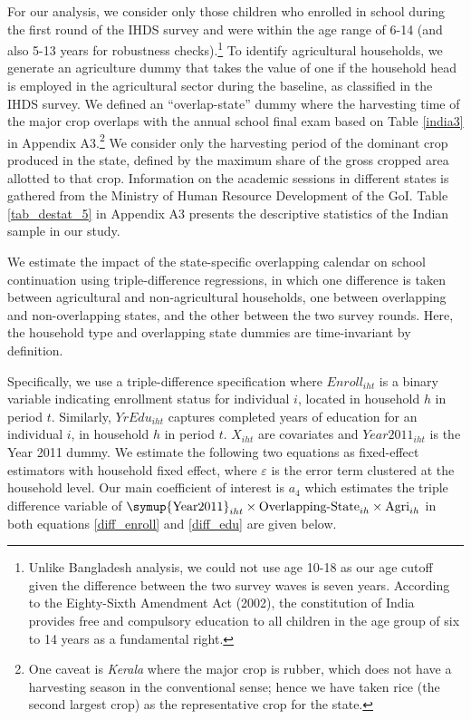 \documentclass[12pt,letterpaper]{article}
\newcommand{\0}{\ensuremath{\mbox{\boldmath $0$}}}
\begin{document}
For our analysis, we consider only those children who enrolled in school during the first round of the IHDS survey and were within the age range of 6-14 (and also 5-13 years for robustness checks).\footnote{Unlike Bangladesh analysis, we could not use age 10-18 as our age cutoff given the difference between the two survey waves is seven years. According to the Eighty-Sixth Amendment Act (2002), the constitution of India provides free and compulsory education to all children in the age group of six to 14 years as a fundamental right.} To identify agricultural households, we generate an agriculture dummy that takes the value of one if the household head is employed in the agricultural sector during the baseline, as classified in the IHDS survey.  We defined an ``overlap-state'' dummy where the harvesting time of the major crop overlaps with the annual school final exam based on Table \ref{india3} in Appendix A3.\footnote{One caveat is \textit{Kerala} where the major crop is rubber, which does not have a harvesting season in the conventional sense; hence we have taken rice (the second largest crop) as the representative crop for the state.} We consider only the harvesting period of the dominant crop produced in the state, defined by the maximum share of the gross cropped area allotted to that crop. Information on the academic sessions in different states is gathered from the Ministry of Human Resource Development of the GoI. Table \ref{tab_destat_5} in Appendix A3 presents the descriptive statistics of the Indian sample in our study.

We estimate the impact of the state-specific overlapping calendar on school continuation using triple-difference regressions, in which one difference is taken between agricultural and non-agricultural households, one between overlapping and non-overlapping states, and the other between the two survey rounds. Here, the household type and overlapping state dummies are time-invariant by definition.

Specifically, we use a triple-difference specification where ${Enroll}_{iht}$ is a binary variable indicating enrollment status for individual $i$, located in household $h$ in period $t$. Similarly, ${YrEdu}_{iht}$ captures completed years of education for an individual $i$, in household $h$ in period $t$. ${X}_{iht}$ are covariates and ${Year2011}_{iht}$ is the Year 2011 dummy. We estimate the following two equations as fixed-effect estimators with household fixed effect, where $\varepsilon$ is the error term clustered at the household level. Our main coefficient of interest is $a_4$ which estimates the triple difference variable of $\textnormal\symup{Year2011}_{iht}\times \textnormal{Overlapping-State}_{ih}\times\textnormal{Agri}_{ih}$ in both equations \ref{diff_enroll} and \ref{diff_edu} are given below.
\end{document}

